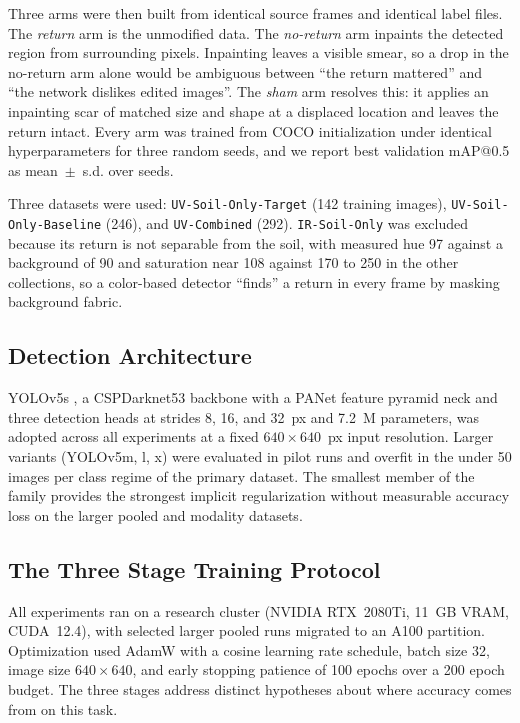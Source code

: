 ﻿\documentclass[journal]{IEEEtran}
\begin{document}
Three arms were then built from identical source frames and identical label files. The \emph{return} arm is the unmodified data. The \emph{no-return} arm inpaints the detected region from surrounding pixels. Inpainting leaves a visible smear, so a drop in the no-return arm alone would be ambiguous between ``the return mattered'' and ``the network dislikes edited images''. The \emph{sham} arm resolves this: it applies an inpainting scar of matched size and shape at a displaced location and leaves the return intact. Every arm was trained from COCO initialization under identical hyperparameters for three random seeds, and we report best validation mAP@0.5 as mean~$\pm$~s.d. over seeds.

Three datasets were used: \texttt{UV-Soil-Only-Target} (142 training images), \texttt{UV-Soil-Only-Baseline} (246), and \texttt{UV-Combined} (292). \texttt{IR-Soil-Only} was excluded because its return is not separable from the soil, with measured hue 97 against a background of 90 and saturation near 108 against 170 to 250 in the other collections, so a color-based detector ``finds'' a return in every frame by masking background fabric.

\subsection{Detection Architecture}
YOLOv5s \cite{jocher2020yolov5}, a CSPDarknet53 backbone with a PANet feature pyramid neck and three detection heads at strides 8, 16, and 32~px and 7.2~M parameters, was adopted across all experiments at a fixed $640 \times 640$~px input resolution. Larger variants (YOLOv5m, l, x) were evaluated in pilot runs and overfit in the under 50 images per class regime of the primary dataset. The smallest member of the family provides the strongest implicit regularization without measurable accuracy loss on the larger pooled and modality datasets.

\subsection{The Three Stage Training Protocol}
All experiments ran on a research cluster (NVIDIA RTX~2080Ti, 11~GB VRAM, CUDA~12.4), with selected larger pooled runs migrated to an A100 partition. Optimization used AdamW with a cosine learning rate schedule, batch size 32, image size $640 \times 640$, and early stopping patience of 100 epochs over a 200 epoch budget. The three stages address distinct hypotheses about where accuracy comes from on this task.
\end{document}
